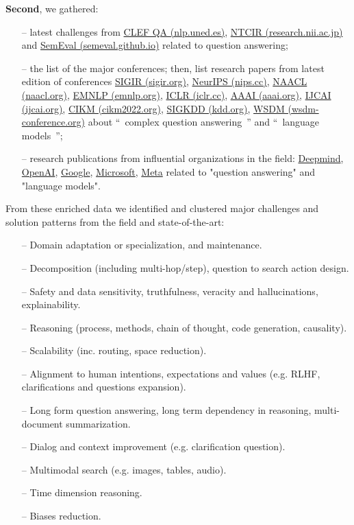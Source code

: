 \documentclass[acmsmall]{acmart}
\begin{document}
\textbf{Second}, we gathered:
\begin{enumerate}
\item[--] latest challenges from \href{http://nlp.uned.es/clef-qa/}{CLEF QA (nlp.uned.es)}, \href{https://research.nii.ac.jp/ntcir/}{NTCIR (research.nii.ac.jp)} and \href{https://semeval.github.io/}{SemEval (semeval.github.io)} related to question answering;
\item[--] the list of the major conferences; then, list research papers from latest edition of conferences \href{https://sigir.org/}{SIGIR (sigir.org)}, \href{https://nips.cc/}{NeurIPS (nips.cc)}, \href{https://naacl.org/}{NAACL (naacl.org)}, \href{https://2022.emnlp.org/}{EMNLP (emnlp.org)}, \href{https://iclr.cc/}{ICLR (iclr.cc)}, \href{https://aaai.org/}{AAAI (aaai.org)}, \href{https://www.ijcai.org/}{IJCAI (ijcai.org)}, \href{https://www.cikm2022.org/}{CIKM (cikm2022.org)}, \href{https://www.kdd.org/}{SIGKDD (kdd.org)}, \href{https://www.wsdm-conference.org/}{WSDM (wsdm-conference.org)} about  ``~complex question answering~'' and ``~language models~'';
\item[--] research publications from influential organizations in the field: \href{https://www.deepmind.com/research}{Deepmind}, \href{https://openai.com/publications/}{OpenAI}, \href{https://research.google/pubs/}{Google}, \href{https://www.microsoft.com/en-us/research/publications/}{Microsoft}, \href{https://research.facebook.com/publications/}{Meta} related to "question answering" and "language models".
\end{enumerate}

From these enriched data we identified and clustered major challenges and solution patterns from the field and state-of-the-art:
\begin{enumerate}
\item[--] Domain adaptation or specialization, and maintenance.
\item[--] Decomposition (including multi-hop/step), question to search action design.
\item[--] Safety and data sensitivity, truthfulness, veracity and hallucinations, explainability.
\item[--] Reasoning (process, methods, chain of thought, code generation, causality).
\item[--] Scalability (inc. routing, space reduction).
\item[--] Alignment to human intentions, expectations and values (e.g. RLHF, clarifications and questions expansion).
\item[--] Long form question answering, long term dependency in reasoning, multi-document summarization.
\item[--] Dialog and context improvement (e.g. clarification question).
\item[--] Multimodal search (e.g. images, tables, audio).
\item[--] Time dimension reasoning.
\item[--] Biases reduction.
\end{enumerate}
\end{document}
